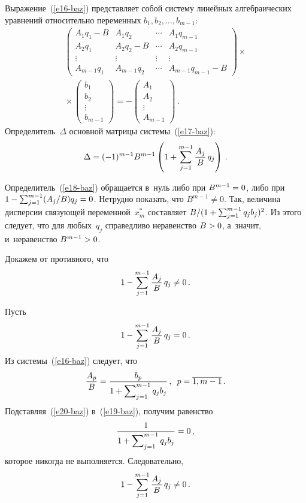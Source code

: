 \begin{multicols}{2}
Выражение~(\ref{e16-baz}) представляет собой систему линейных 
алгебраических уравнений относительно переменных $b_1, b_2, \ldots , b_{m-1}$:
    \begin{multline}
    \begin{pmatrix}
A_1 q_1-B & A_1q_2&\cdots& A_1q_{m-1}\\
A_2q_1 & A_2q_2-B &\cdots & A_2 q_{m-1}\\
\vdots &\vdots& \vdots& \vdots\\
A_{m-1} q_1 & A_{m-1}q_2&\cdots & A_{m-1} q_{m-1}-B\end{pmatrix}\times{}\\
{}\times \begin{pmatrix}
b_1\\ b_2\\ \vdots \\ b_{m-1}\end{pmatrix}=
-\begin{pmatrix}
A_1 \\ A_2\\ \vdots\\ A_{m-1}
\end{pmatrix}\,.
\label{e17-baz}
\end{multline}
    Определитель~$\Delta$ основной матрицы системы~(\ref{e17-baz}):
    \begin{equation}
    \Delta =(-1)^{m-1} B^{m-1}\left( 1+\sum\limits_{j=1}^{m-1} 
\displaystyle\frac{\displaystyle A_j\mathstrut}{\displaystyle B\mathstrut}\,q_j\right)\,.
    \label{e18-baz}
    \end{equation}
    
Определитель~(\ref{e18-baz}) обращается в~нуль либо при $B^{m-1}\hm=0$, 
либо при
$1\hm- \sum\nolimits_{j=1}^{m-1}(A_j/B)q_j\hm=0$. Нетрудно показать, что  
$B^{m-1}\not= 0$. Так, величина дисперсии связующей переменной~$x_m^*$ 
составляет $B/(1\hm+ \sum\nolimits^{m-1}_{j=1} q_j b_j)^2$. Из этого следует, 
что для любых~$q_j$ справедливо неравенство $B\hm>0$, а~значит, 
и~неравенство $B^{m-1}\hm>0$.
    
    Докажем от противного, что 
    $$
    1- \sum\limits_{j=1}^{m-1}\displaystyle\frac{\displaystyle A_j\mathstrut}{\displaystyle B\mathstrut}\,q_j 
\not= 0\,.
$$

 Пусть
    \begin{equation}
1-\sum\limits_{j=1}^{m-1}\displaystyle\frac{\displaystyle A_j\mathstrut}{\displaystyle B\mathstrut}\,q_j=0\,.
\label{e19-baz}
\end{equation}
    Из системы~(\ref{e16-baz}) следует, что
    \begin{equation}
    \displaystyle\frac{\displaystyle A_p\mathstrut}{\displaystyle B\mathstrut}= \displaystyle\frac{\displaystyle b_p\mathstrut}{\displaystyle 1+\sum\nolimits_{j=1}^{m-1} q_j b_j\mathstrut}\,,\enskip p= 
\overline{1,m-1}\,.
    \label{e20-baz}
    \end{equation}
    Подставляя~(\ref{e20-baz}) в~(\ref{e19-baz}), получим равенство 
    $$
    \displaystyle\frac{\displaystyle 1\mathstrut}{\displaystyle 1+ \sum\nolimits_{j=1}^{m-1} q_j b_j\mathstrut}=0\,,
    $$
     которое никогда не выполняется. 
Следовательно, 
$$
1- \sum\limits_{j=1}^{m-1}\displaystyle\frac{\displaystyle A_j\mathstrut}{\displaystyle B\mathstrut}\,q_j \not= 0\,.
$$
    

\end{multicols}
